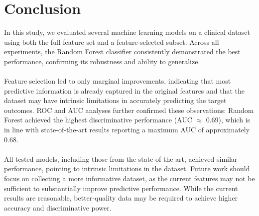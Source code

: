 \section{Conclusion}

In this study, we evaluated several machine learning models on a clinical dataset using both the full feature set and a feature-selected subset. Across all experiments, the Random Forest classifier consistently demonstrated the best performance, confirming its robustness and ability to generalize.\\\\
Feature selection led to only marginal improvements, indicating that most predictive information is already captured in the original features and that the dataset may have intrinsic limitations in accurately predicting the target outcomes. ROC and AUC analyses further confirmed these observations: Random Forest achieved the highest discriminative performance (AUC $\approx$ 0.69), which is in line with state-of-the-art results reporting a maximum AUC of approximately 0.68.\\\\
All tested models, including those from the state-of-the-art, achieved similar performance, pointing to intrinsic limitations in the dataset. Future work should focus on collecting a more informative dataset, as the current features may not be sufficient to substantially improve predictive performance. While the current results are reasonable, better-quality data may be required to achieve higher accuracy and discriminative power.